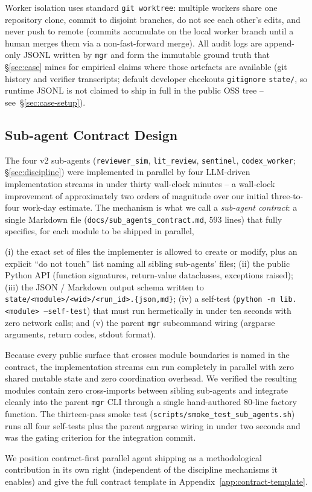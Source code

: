 Worker isolation uses standard \texttt{git worktree}: multiple
workers share one repository clone, commit to disjoint branches, do
not see each other's edits, and never push to remote (commits
accumulate on the local worker branch until a human merges them via
a non-fast-forward merge). All audit logs are append-only JSONL
written by \texttt{mgr} and form the immutable ground truth that
\S\ref{sec:case} mines for empirical claims where those artefacts are
available (git history and verifier transcripts; default developer
checkouts \texttt{gitignore} \texttt{state/}, so runtime JSONL is not
claimed to ship in full in the public OSS tree -- see~\S\ref{sec:case-setup}).

\subsection{Sub-agent Contract Design}
\label{sec:arch-contract}

The four v2 sub-agents (\texttt{reviewer\_sim}, \texttt{lit\_review},
\texttt{sentinel}, \texttt{codex\_worker}; \S\ref{sec:discipline}) were
implemented in parallel by four LLM-driven implementation streams in
under thirty wall-clock minutes -- a wall-clock improvement of
approximately two orders of magnitude over our initial three-to-four
work-day estimate. The mechanism is what we call a \emph{sub-agent
contract}: a single Markdown file
(\texttt{docs/sub\_agents\_contract.md}, 593 lines) that fully specifies,
for each module to be shipped in parallel,

(i) the exact set of files the implementer is allowed to create or
modify, plus an explicit ``do not touch'' list naming all sibling
sub-agents' files; (ii) the public Python API (function signatures,
return-value dataclasses, exceptions raised); (iii) the JSON / Markdown
output schema written to
\texttt{state/<module>/<wid>/<run\_id>.\{json,md\}}; (iv) a self-test
(\texttt{python -m lib.<module> --self-test}) that must run
hermetically in under ten seconds with zero network calls; and (v) the
parent \texttt{mgr} subcommand wiring (argparse arguments, return
codes, stdout format).

Because every public surface that crosses module boundaries is named in
the contract, the implementation streams can run completely in parallel
with zero shared mutable state and zero coordination overhead. We
verified the resulting modules contain zero cross-imports between
sibling sub-agents and integrate cleanly into the parent \texttt{mgr}
CLI through a single hand-authored 80-line factory function. The
thirteen-pass smoke test (\texttt{scripts/smoke\_test\_sub\_agents.sh})
runs all four self-tests plus the parent argparse wiring in under two
seconds and was the gating criterion for the integration commit.

We position contract-first parallel agent shipping as a methodological
contribution in its own right (independent of the discipline mechanisms
it enables) and give the full contract template in
Appendix~\ref{app:contract-template}.
